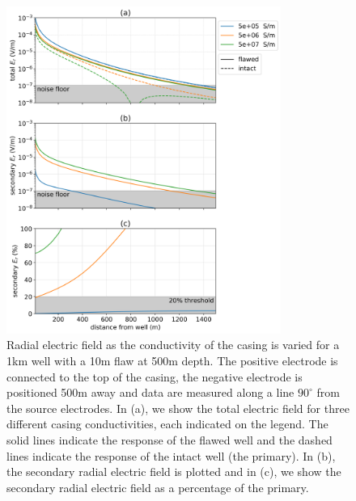 \begin{figure}
    \begin{center}
    \includegraphics[width=0.8\textwidth]{figures/dc_casing/integrity_conductivity_casing.png}
    \end{center}
\caption{
    Radial electric field as the conductivity of the casing is varied for a 1km well with a 10m flaw at 500m depth.
    The positive electrode is connected to the top of the casing, the negative electrode
    is positioned 500m away and data are measured along a line $90^\circ$ from the
    source electrodes. In (a), we show the total electric field for three different casing conductivities,
    each indicated on the legend. The solid lines indicate the response of the flawed well and the dashed lines indicate the response of the intact well (the primary).
    In (b), the secondary radial electric field is plotted and in (c), we show the
    secondary radial electric field as a percentage of the primary.
}
\label{fig:integrity_conductivity_casing}
\end{figure}
